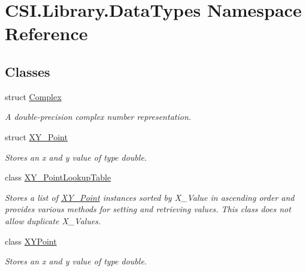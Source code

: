 \hypertarget{namespace_c_s_i_1_1_library_1_1_data_types}{}\section{C\+S\+I.\+Library.\+Data\+Types Namespace Reference}
\label{namespace_c_s_i_1_1_library_1_1_data_types}
\subsection*{Classes}
\begin{DoxyCompactItemize}
\item 
struct \mbox{\hyperlink{struct_c_s_i_1_1_library_1_1_data_types_1_1_complex}{Complex}}
\begin{DoxyCompactList}\small\item\em A double-\/precision complex number representation. \end{DoxyCompactList}\item 
struct \mbox{\hyperlink{struct_c_s_i_1_1_library_1_1_data_types_1_1_x_y___point}{X\+Y\+\_\+\+Point}}
\begin{DoxyCompactList}\small\item\em Stores an x and y value of type double. \end{DoxyCompactList}\item 
class \mbox{\hyperlink{class_c_s_i_1_1_library_1_1_data_types_1_1_x_y___point_lookup_table}{X\+Y\+\_\+\+Point\+Lookup\+Table}}
\begin{DoxyCompactList}\small\item\em Stores a list of \mbox{\hyperlink{struct_c_s_i_1_1_library_1_1_data_types_1_1_x_y___point}{X\+Y\+\_\+\+Point}} instances sorted by X\+\_\+\+Value in ascending order and provides various methods for setting and retrieving values. This class does not allow duplicate X\+\_\+\+Values. \end{DoxyCompactList}\item 
class \mbox{\hyperlink{class_c_s_i_1_1_library_1_1_data_types_1_1_x_y_point}{X\+Y\+Point}}
\begin{DoxyCompactList}\small\item\em Stores an x and y value of type double. \end{DoxyCompactList}\end{DoxyCompactItemize}
